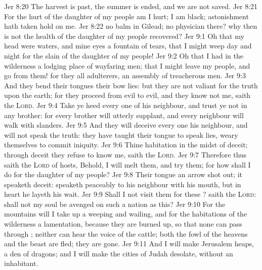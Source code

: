 \vs Jer 8:20 The harvest is past, the summer is ended, and we are not saved.
\vs Jer 8:21 For the hurt of the daughter of my people am I hurt; I am black; astonishment hath taken hold on me.
\vs Jer 8:22  no balm in Gilead;  no physician there? why then is not the health of the daughter of my people recovered?
\vs Jer 9:1 Oh that my head were waters, and mine eyes a fountain of tears, that I might weep day and night for the slain of the daughter of my people!
\vs Jer 9:2 Oh that I had in the wilderness a lodging place of wayfaring men; that I might leave my people, and go from them! for they  all adulterers, an assembly of treacherous men.
\vs Jer 9:3 And they bend their tongues  their bow  lies: but they are not valiant for the truth upon the earth; for they proceed from evil to evil, and they know not me, saith the \textsc{Lord}.
\vs Jer 9:4 Take ye heed every one of his neighbour, and trust ye not in any brother: for every brother will utterly supplant, and every neighbour will walk with slanders.
\vs Jer 9:5 And they will deceive every one his neighbour, and will not speak the truth: they have taught their tongue to speak lies,  weary themselves to commit iniquity.
\vs Jer 9:6 Thine habitation  in the midst of deceit; through deceit they refuse to know me, saith the \textsc{Lord}.
\vs Jer 9:7 Therefore thus saith the \textsc{Lord} of hosts, Behold, I will melt them, and try them; for how shall I do for the daughter of my people?
\vs Jer 9:8 Their tongue  an arrow shot out; it speaketh deceit:  speaketh peaceably to his neighbour with his mouth, but in heart he layeth his wait.
\vs Jer 9:9 Shall I not visit them for these ? saith the \textsc{Lord}: shall not my soul be avenged on such a nation as this?
\vs Jer 9:10 For the mountains will I take up a weeping and wailing, and for the habitations of the wilderness a lamentation, because they are burned up, so that none can pass through ; neither can  hear the voice of the cattle; both the fowl of the heavens and the beast are fled; they are gone.
\vs Jer 9:11 And I will make Jerusalem heaps,  a den of dragons; and I will make the cities of Judah desolate, without an inhabitant.
